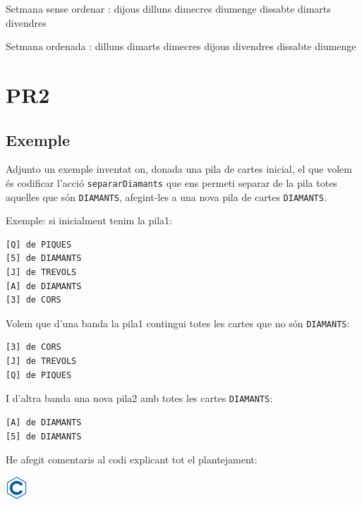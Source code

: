 \documentclass[]{book}
\newenvironment{Shaded}{\begin{snugshade}}{\end{snugshade}}
\newcommand{\NormalTok}[1]{#1}
\begin{document}
\begin{Shaded}
\begin{Highlighting}[]
\NormalTok{Setmana sense ordenar : }
\NormalTok{dijous}
\NormalTok{dilluns}
\NormalTok{dimecres}
\NormalTok{diumenge}
\NormalTok{dissabte}
\NormalTok{dimarts}
\NormalTok{divendres}

\NormalTok{Setmana ordenada : }
\NormalTok{dilluns}
\NormalTok{dimarts}
\NormalTok{dimecres}
\NormalTok{dijous}
\NormalTok{divendres}
\NormalTok{dissabte}
\NormalTok{diumenge}
\end{Highlighting}
\end{Shaded}

\hypertarget{pr2}{%
\chapter{PR2}\label{pr2}}

\hypertarget{exemple-1}{%
\section{Exemple}\label{exemple-1}}

Adjunto un exemple inventat on, donada una pila de cartes inicial, el que volem és codificar l'acció \texttt{separarDiamants} que ens permeti separar de la pila totes aquelles que són \texttt{DIAMANTS}, afegint-les a una nova pila de cartes \texttt{DIAMANTS}.

Exemple: si inicialment tenim la pila1:

\begin{verbatim}
[Q] de PIQUES
[5] de DIAMANTS
[J] de TREVOLS
[A] de DIAMANTS
[3] de CORS
\end{verbatim}

Volem que d'una banda la pila1 contingui totes les cartes que no són \texttt{DIAMANTS}:

\begin{verbatim}
[3] de CORS
[J] de TREVOLS
[Q] de PIQUES
\end{verbatim}

I d'altra banda una nova pila2 amb totes les cartes \texttt{DIAMANTS}:

\begin{verbatim}
[A] de DIAMANTS
[5] de DIAMANTS
\end{verbatim}

He afegit comentaris al codi explicant tot el plantejament:

\includegraphics{./img/c.png}
\end{document}
